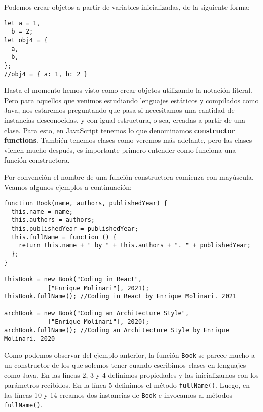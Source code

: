 \documentclass[a4paper, oneside, titlepage, 12pt]{book}
\begin{document}
Podemos crear objetos a partir de variables inicializadas, de la siguiente forma:

\begin{verbatim}
let a = 1,
  b = 2;
let obj4 = {
  a,
  b,
};
//obj4 = { a: 1, b: 2 }	
\end{verbatim}

Hasta el momento hemos visto como crear objetos utilizando la notación literal. Pero para aquellos que venimos estudiando lenguajes estáticos y compilados como Java, nos estaremos preguntando que pasa si necesitamos una cantidad de instancias desconocidas, y con igual estructura, o sea, creadas a partir de una clase. Para esto, en JavaScript tenemos lo que denominamos \textbf{constructor functions}. También tenemos clases como veremos más adelante, pero las clases vienen mucho después, es importante primero entender como funciona una función constructora.
\newline

Por convención el nombre de una función constructora comienza con mayúscula. Veamos algunos ejemplos a continuación:

\begin{verbatim}
function Book(name, authors, publishedYear) {
  this.name = name;
  this.authors = authors;
  this.publishedYear = publishedYear;
  this.fullName = function () {
    return this.name + " by " + this.authors + ". " + publishedYear;
  };
}

thisBook = new Book("Coding in React", 
			["Enrique Molinari"], 2021);
thisBook.fullName(); //Coding in React by Enrique Molinari. 2021

archBook = new Book("Coding an Architecture Style", 
			["Enrique Molinari"], 2020);
archBook.fullName(); //Coding an Architecture Style by Enrique Molinari. 2020 
\end{verbatim}

Como podemos observar del ejemplo anterior, la función \texttt{Book} se parece mucho a un constructor de los que solemos tener cuando escribimos clases en lenguajes como Java. En las líneas 2, 3 y 4 definimos propiedades y las inicializamos con los parámetros recibidos. En la línea 5 definimos el método \texttt{fullName()}. Luego, en las líneas 10 y 14 creamos dos instancias de \texttt{Book} e invocamos al métodos \texttt{fullName()}. 
\end{document}
